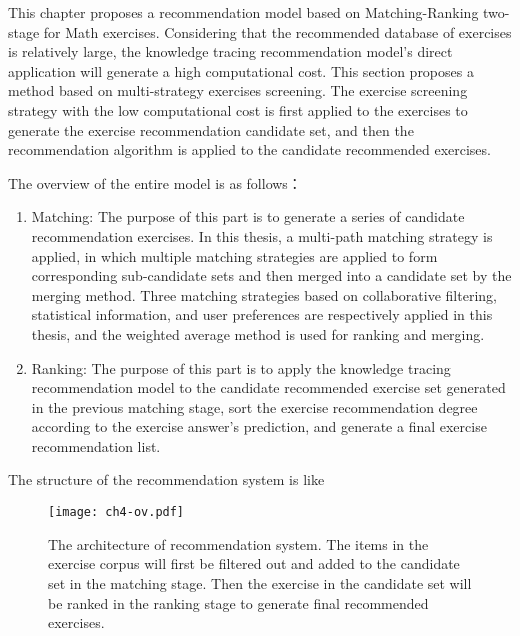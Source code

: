 This chapter proposes a recommendation model based on Matching-Ranking two-stage for Math exercises. Considering that the recommended database of exercises is relatively large, the knowledge tracing recommendation model's direct application will generate a high computational cost. This section proposes a method based on multi-strategy exercises screening. The exercise screening strategy with the low computational cost is first applied to the exercises to generate the exercise recommendation candidate set, and then the recommendation algorithm is applied to the candidate recommended exercises.



The overview of the entire model is as follows：
\begin{enumerate}
    \item Matching: The purpose of this part is to generate a series of candidate recommendation exercises. In this thesis, a multi-path matching strategy is applied, in which multiple matching strategies are applied to form corresponding sub-candidate sets and then merged into a candidate set by the merging method. Three matching strategies based on collaborative filtering, statistical information, and user preferences are respectively applied in this thesis, and the weighted average method is used for ranking and merging.
    \item Ranking: The purpose of this part is to apply the knowledge tracing recommendation model to the candidate recommended exercise set generated in the previous matching stage, sort the exercise recommendation degree according to the exercise answer's prediction, and generate a final exercise recommendation list.
\end{enumerate}

The structure of the recommendation system is like \figname{\ref{fig:ch4-model-architecture}}

\begin{figure}[htbp!]
    \centering
    \texttt{[image: ch4-ov.pdf]}
    \caption{The architecture of recommendation system. The items in the exercise corpus will first be filtered out and added to the candidate set in the matching stage. Then the exercise in the candidate set will be ranked in the ranking stage to generate final recommended exercises.}\label{fig:ch4-model-architecture}
\end{figure}

